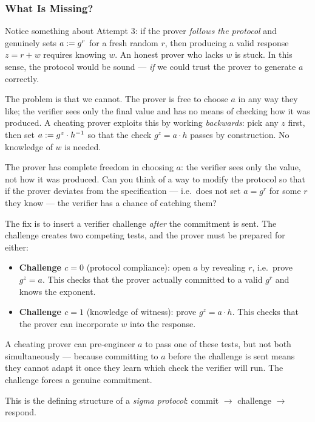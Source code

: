 \subsubsection{What Is Missing?}

Notice something about Attempt 3: if the prover \emph{follows the protocol} and genuinely sets $a \mathrel{:=} g^r$ for a fresh random $r$, then producing a valid response $z = r + w$ requires knowing $w$. An honest prover who lacks $w$ is stuck. In this sense, the protocol would be sound --- \emph{if} we could trust the prover to generate $a$ correctly.

The problem is that we cannot. The prover is free to choose $a$ in any way they like; the verifier sees only the final value and has no means of checking how it was produced. A cheating prover exploits this by working \emph{backwards}: pick any $z$ first, then set $a \mathrel{:=} g^z \cdot h^{-1}$ so that the check $g^z = a \cdot h$ passes by construction. No knowledge of $w$ is needed.

\begin{exercisebox}
The prover has complete freedom in choosing $a$: the verifier sees only the value, not how it was produced. Can you think of a way to modify the protocol so that if the prover deviates from the specification --- i.e.\ does not set $a = g^r$ for some $r$ they know --- the verifier has a chance of catching them?
\end{exercisebox}

The fix is to insert a verifier challenge \emph{after} the commitment is sent. The challenge creates two competing tests, and the prover must be prepared for either:
\begin{itemize}
  \item \textbf{Challenge $c = 0$} (protocol compliance): open $a$ by revealing $r$, i.e.\ prove $g^z = a$. This checks that the prover actually committed to a valid $g^r$ and knows the exponent.
  \item \textbf{Challenge $c = 1$} (knowledge of witness): prove $g^z = a \cdot h$. This checks that the prover can incorporate $w$ into the response.
\end{itemize}
A cheating prover can pre-engineer $a$ to pass one of these tests, but not both simultaneously --- because committing to $a$ before the challenge is sent means they cannot adapt it once they learn which check the verifier will run. The challenge forces a genuine commitment.

This is the defining structure of a \emph{sigma protocol}: commit $\to$ challenge $\to$ respond.

